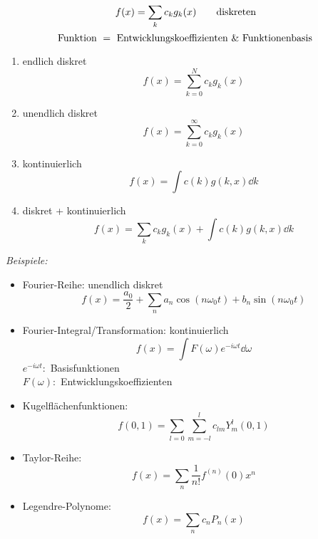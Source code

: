 \begin{equation*}
f(x) = \sum_{k} c_k g_k(x) \qquad \textrm{diskreten}
\end{equation*}
\begin{equation*}
\textrm{Funktion } = \textrm{ Entwicklungskoeffizienten } \& \textrm{ Funktionenbasis}
\end{equation*}
\begin{enumerate}[(1)]
	\item endlich diskret
	\begin{equation*}
	f(x) = \sum_{k=0}^{N} c_k g_k(x)
	\end{equation*}
	\item unendlich diskret
	\begin{equation*}
	f(x) = \sum_{k=0}^{\infty} c_k g_k(x)
	\end{equation*}
	\item kontinuierlich
	\begin{equation*}
	f(x) = \int c(k) g(k,x) \dd k
	\end{equation*}
	\item diskret + kontinuierlich
	\begin{equation*}
	f(x) = \sum_{k} c_k g_k(x) + \int c(k) g(k,x) \dd k
	\end{equation*}
\end{enumerate}
\emph{Beispiele:}
\begin{itemize}
	\item Fourier-Reihe: unendlich diskret
	\begin{equation*}
	f(x) = \frac{a_0}{2} + \sum_n a_n \cos(n \omega_0 t) + b_n \sin(n \omega_0 t)
	\end{equation*}
	\item Fourier-Integral/Transformation: kontinuierlich
	\begin{equation*}
	f(x) = \int F(\omega) e^{-i \omega t} \dd \omega
	\end{equation*}
	$ e^{-i \omega t} : $ Basisfunktionen\\
	$ F(\omega) : $ Entwicklungskoeffizienten
	\item Kugelflächenfunktionen:
	\begin{equation*}
	f(0,1) = \sum_{l = 0} \sum_{m = -l}^{l} c_{lm} Y_{m}^{l}(0,1)
	\end{equation*}
	\item Taylor-Reihe:
	\begin{equation*}
	f(x) = \sum_n \frac{1}{n !} f^{(n)} (0) x^n
	\end{equation*}
	\item Legendre-Polynome:
	\begin{equation*}
	f(x) = \sum_n c_n P_n(x)
	\end{equation*}
\end{itemize}


